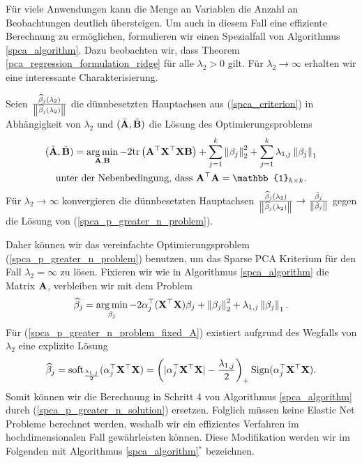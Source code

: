 Für viele Anwendungen kann die Menge an Variablen die Anzahl an Beobachtungen deutlich übersteigen. Um auch in diesem Fall eine effiziente Berechnung zu ermöglichen, formulieren wir einen Spezialfall von Algorithmus \ref{spca_algorithm}. Dazu beobachten wir, dass Theorem \ref{pca_regression_formulation_ridge} für alle $\lambda_2 > 0$ gilt. Für $\lambda_2 \to \infty$ erhalten wir eine interessante Charakterisierung.
\begin{thm} \label{spca_p_greater_n}
Seien $\frac{\widehat{\beta}_j(\lambda_2)}{\left\lVert \widehat{\beta}_j(\lambda_2) \right\rVert}$ die dünnbesetzten Hauptachsen aus (\ref{spca_criterion}) in Abhängigkeit von $\lambda_2$
und $(\tilde{\mathbf{A}}, \tilde{\mathbf{B}})$ die Lösung des Optimierungsproblems
\begin{align}
\label{spca_p_greater_n_problem}
\begin{gathered}
(\tilde{\mat A}, \tilde{\mat B}) = \argmin_{\mat A, \mat B} -2\spur{\mat A^{\top}\mat X^{\top}\mat X \mat B} + \sum_{j=1}^k \norm{\beta_j}_2^2 + \sum_{j=1}^k \lambda_{1,j}\norm{\beta_j}_1\\
\text{unter der Nebenbedingung, dass } \mat A^{\top} \mat A = \mat{\mathbb{1}}_{k \times k}.
\end{gathered}
\end{align}
Für $\lambda_2 \to \infty$ konvergieren die dünnbesetzten Hauptachsen $\frac{\widehat{\beta}_j(\lambda_2)}{\left\lVert \widehat{\beta}_j(\lambda_2) \right\rVert} \to \frac{\tilde{\beta}_j}{\left\lVert \tilde{\beta}_j \right\rVert}$ gegen die Lösung von (\ref{spca_p_greater_n_problem}). 
\end{thm}
Daher können wir das vereinfachte Optimierungsproblem (\ref{spca_p_greater_n_problem}) benutzen, um das Sparse PCA Kriterium für den Fall $\lambda_2 = \infty$ zu lösen. Fixieren wir wie in Algorithmus \ref{spca_algorithm} die Matrix $\mathbf{A}$, verbleiben wir mit dem Problem
\begin{align}
\label{spca_p_greater_n_problem_fixed_A}
\widehat{\beta}_j = \operatorname*{arg\,min}_{\beta_j} -2 \alpha_j^{\top}(\mathbf{X}^{\top}\mathbf{X})\beta_j + \left\lVert \beta_j \right\rVert_{2}^{2} + \lambda_{1,j}\left\lVert \beta_j \right\rVert_1.
\end{align}
Für (\ref{spca_p_greater_n_problem_fixed_A}) existiert aufgrund des Wegfalls von $\lambda_2$ eine explizite Lösung
\begin{align}
\label{spca_p_greater_n_solution}
\widehat{\beta}_j = \operatorname{soft}_{\frac{\lambda_{1,j}}{2}}(\alpha_j^{\top}\mathbf{X}^{\top}\mathbf{X}) = \left(|\alpha_j^{\top}\mathbf{X}^{\top}\mathbf{X}| - \frac{\lambda_{1,j}}{2}\right)_+ \operatorname{Sign}(\alpha_j^{\top}\mathbf{X}^{\top}\mathbf{X}).
\end{align}
Somit können wir die Berechnung in Schritt 4 von Algorithmus \ref{spca_algorithm} durch (\ref{spca_p_greater_n_solution}) ersetzen. Folglich müssen keine Elastic Net Probleme berechnet werden, weshalb wir ein effizientes Verfahren im hochdimensionalen Fall gewährleisten können. Diese Modifikation werden wir im Folgenden mit Algorithmus \ref{spca_algorithm}$^*$ bezeichnen.

